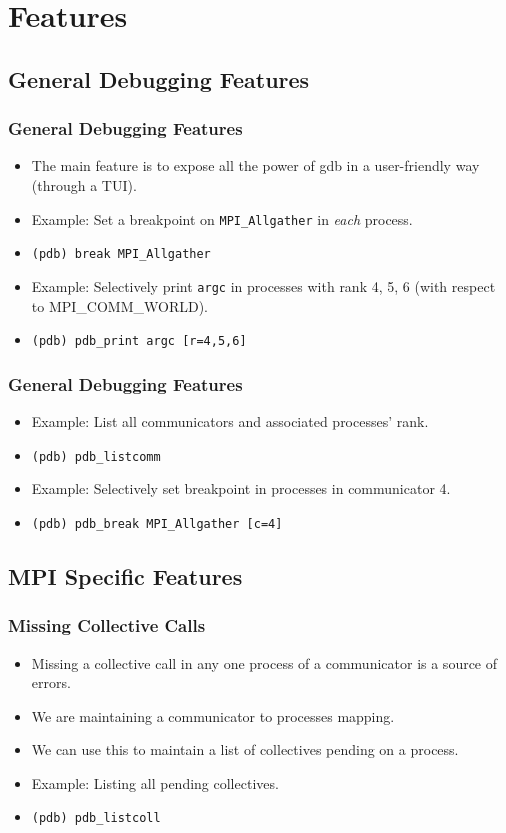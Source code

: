\documentclass{beamer}
\begin{document}
\section{Features}

\subsection{General Debugging Features}

\begin{frame}
  \frametitle{General Debugging Features}
 \begin{itemize}
 \item <1-> The main feature is to expose all the power of gdb in a user-friendly way (through a TUI).
 \item <2-> Example: Set a breakpoint on \texttt{MPI\_Allgather} in \textit{each} process.
 \item <3-> \texttt{(pdb) break MPI\_Allgather}
 \item <4-> Example: Selectively print \texttt{argc} in processes with rank 4, 5, 6 (with respect to MPI\_COMM\_WORLD).
 \item <5-> \texttt{(pdb) pdb\_print argc [r=4,5,6]}
 \end{itemize}
\end{frame}

\begin{frame}
  \frametitle{General Debugging Features}
 \begin{itemize}
 \item <1-> Example: List all communicators and associated processes' rank.
 \item <2-> \texttt{(pdb) pdb\_listcomm}
 \item <3-> Example: Selectively set breakpoint in processes in communicator 4.
 \item <4-> \texttt{(pdb) pdb\_break MPI\_Allgather [c=4]}
 \end{itemize}
\end{frame}


\subsection{MPI Specific Features}
\begin{frame}
  \frametitle{Missing Collective Calls}
 \begin{itemize}
 \item <1-> Missing a collective call in any one process of a communicator is a source of errors.
 \item <2-> We are maintaining a communicator to processes mapping.
 \item <3-> We can use this to maintain a list of collectives pending on a process.
 \item <4-> Example: Listing all pending collectives.
 \item <5-> \texttt{(pdb) pdb\_listcoll}
 \end{itemize}
\end{frame}
\end{document}
